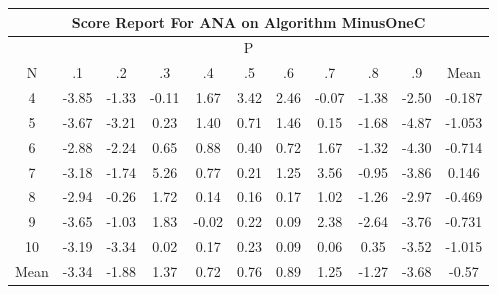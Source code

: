\documentclass[11pt,a4paper]{report}
\begin{document}
\begin{longtable}{ | c || c | c | c | c | c | c | c | c | c || c |}
\hline
\multicolumn{11}{|c|}{ Score Report For ANA on Algorithm MinusOneC} \\
\hline
\multicolumn{11}{|c|}{ P } \\
\hline
N & .1 & .2 & .3 & .4 & .5 & .6 & .7 & .8 & .9 & Mean\\
 \hline
 \hline
 \endhead
  4 &  \cellcolor[HTML]{FF9F9F} -3.85 &  \cellcolor[HTML]{FFDFDF} -1.33 &  \cellcolor[HTML]{FFFFFF} -0.11 &  \cellcolor[HTML]{D7D7FF} 1.67 &  \cellcolor[HTML]{A7A7FF} 3.42 &  \cellcolor[HTML]{BFBFFF} 2.46 &  \cellcolor[HTML]{FFFFFF} -0.07 &  \cellcolor[HTML]{FFDFDF} -1.38 &  \cellcolor[HTML]{FFBFBF} -2.50 & -0.187 \\
  5 &  \cellcolor[HTML]{FF9F9F} -3.67 &  \cellcolor[HTML]{FFAFAF} -3.21 &  \cellcolor[HTML]{F7F7FF} 0.23 &  \cellcolor[HTML]{DFDFFF} 1.40 &  \cellcolor[HTML]{EFEFFF} 0.71 &  \cellcolor[HTML]{D7D7FF} 1.46 &  \cellcolor[HTML]{FFFFFF} 0.15 &  \cellcolor[HTML]{FFD7D7} -1.68 &  \cellcolor[HTML]{FF8787} -4.87 & -1.053 \\
  6 &  \cellcolor[HTML]{FFB7B7} -2.88 &  \cellcolor[HTML]{FFC7C7} -2.24 &  \cellcolor[HTML]{EFEFFF} 0.65 &  \cellcolor[HTML]{E7E7FF} 0.88 &  \cellcolor[HTML]{F7F7FF} 0.40 &  \cellcolor[HTML]{EFEFFF} 0.72 &  \cellcolor[HTML]{D7D7FF} 1.67 &  \cellcolor[HTML]{FFDFDF} -1.32 &  \cellcolor[HTML]{FF8F8F} -4.30 & -0.714 \\
  7 &  \cellcolor[HTML]{FFAFAF} -3.18 &  \cellcolor[HTML]{FFD7D7} -1.74 &  \cellcolor[HTML]{7878FF} 5.26 &  \cellcolor[HTML]{EFEFFF} 0.77 &  \cellcolor[HTML]{F7F7FF} 0.21 &  \cellcolor[HTML]{DFDFFF} 1.25 &  \cellcolor[HTML]{A7A7FF} 3.56 &  \cellcolor[HTML]{FFE7E7} -0.95 &  \cellcolor[HTML]{FF9F9F} -3.86 & 0.146 \\
  8 &  \cellcolor[HTML]{FFB7B7} -2.94 &  \cellcolor[HTML]{FFF7F7} -0.26 &  \cellcolor[HTML]{D7D7FF} 1.72 &  \cellcolor[HTML]{FFFFFF} 0.14 &  \cellcolor[HTML]{F7F7FF} 0.16 &  \cellcolor[HTML]{F7F7FF} 0.17 &  \cellcolor[HTML]{E7E7FF} 1.02 &  \cellcolor[HTML]{FFDFDF} -1.26 &  \cellcolor[HTML]{FFB7B7} -2.97 & -0.469 \\
  9 &  \cellcolor[HTML]{FFA7A7} -3.65 &  \cellcolor[HTML]{FFE7E7} -1.03 &  \cellcolor[HTML]{CFCFFF} 1.83 &  \cellcolor[HTML]{FFFFFF} -0.02 &  \cellcolor[HTML]{F7F7FF} 0.22 &  \cellcolor[HTML]{FFFFFF} 0.09 &  \cellcolor[HTML]{C7C7FF} 2.38 &  \cellcolor[HTML]{FFBFBF} -2.64 &  \cellcolor[HTML]{FF9F9F} -3.76 & -0.731 \\
  10 &  \cellcolor[HTML]{FFAFAF} -3.19 &  \cellcolor[HTML]{FFA7A7} -3.34 &  \cellcolor[HTML]{FFFFFF} 0.02 &  \cellcolor[HTML]{F7F7FF} 0.17 &  \cellcolor[HTML]{F7F7FF} 0.23 &  \cellcolor[HTML]{FFFFFF} 0.09 &  \cellcolor[HTML]{FFFFFF} 0.06 &  \cellcolor[HTML]{F7F7FF} 0.35 &  \cellcolor[HTML]{FFA7A7} -3.52 & -1.015 \\
 \hline
 \hline
Mean &  \cellcolor[HTML]{FFA7A7} -3.34 &  \cellcolor[HTML]{FFCFCF} -1.88 &  \cellcolor[HTML]{DFDFFF} 1.37 &  \cellcolor[HTML]{EFEFFF} 0.72 &  \cellcolor[HTML]{EFEFFF} 0.76 &  \cellcolor[HTML]{E7E7FF} 0.89 &  \cellcolor[HTML]{DFDFFF} 1.25 &  \cellcolor[HTML]{FFDFDF} -1.27 &  \cellcolor[HTML]{FF9F9F} -3.68 &  \cellcolor[HTML]{FFEFEF} -0.57
\end{longtable}
\end{document}
